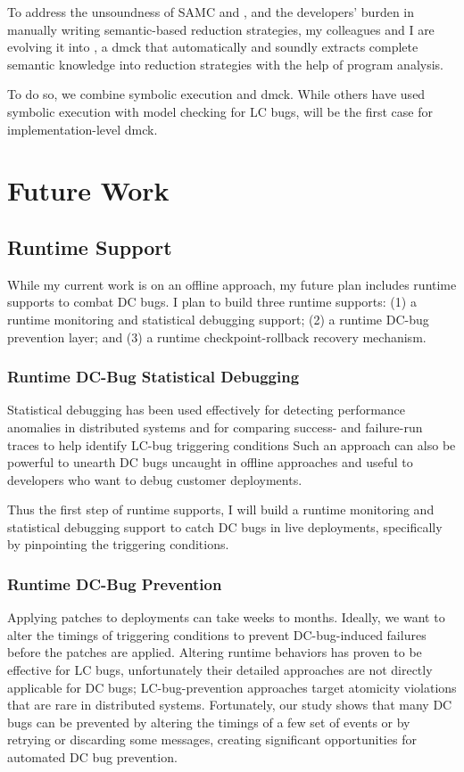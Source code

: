 \documentclass[11pt]{article}
\begin{document}
To address the unsoundness of SAMC and \fullcheck, and the developers' burden in
manually writing semantic-based reduction strategies, my colleagues and I are
evolving it into \autocheck, a dmck that automatically and soundly extracts
complete semantic knowledge into reduction strategies with the help of program
analysis.

To do so, we combine symbolic execution and dmck. While others have used
symbolic execution with model checking for LC bugs, \autocheck will be the first
case for implementation-level dmck. 

\section*{Future Work}

\subsection{Runtime Support}

While my current work is on an offline approach, my future plan includes runtime
supports to combat DC bugs. I plan to build three runtime supports: (1) a
runtime monitoring and statistical debugging support; (2) a runtime DC-bug
prevention layer; and (3) a runtime checkpoint-rollback recovery mechanism.

\subsubsection*{Runtime DC-Bug Statistical Debugging}

Statistical debugging has been used effectively for detecting performance
anomalies in distributed systems and for comparing success- and failure-run
traces to help identify LC-bug triggering conditions Such an approach can also
be powerful to unearth DC bugs uncaught in offline approaches and useful to
developers who want to debug customer deployments. 

Thus the first step of runtime supports, I will build a runtime monitoring and
statistical debugging support to catch DC bugs in live deployments, specifically
by pinpointing the triggering conditions.

\subsubsection*{Runtime DC-Bug Prevention}

Applying patches to deployments can take weeks to months. Ideally, we want to
alter the timings of triggering conditions to prevent DC-bug-induced failures
before the patches are applied. Altering runtime behaviors has proven to be
effective for LC bugs, unfortunately their detailed approaches are not directly
applicable for DC bugs; LC-bug-prevention approaches target atomicity violations
that are rare in distributed systems. Fortunately, our study shows that many DC
bugs can be prevented by altering the timings of a few set of events or by
retrying or discarding some messages, creating significant opportunities for
automated DC bug prevention.
\end{document}
